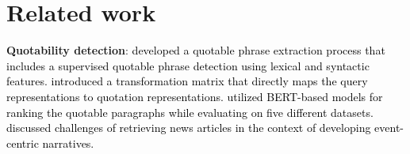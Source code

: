 \section{Related work}
\noindent\textbf{Quotability detection}:
\textcolor{black}{\citet{bendersky-smith-2012-dictionary} developed a quotable phrase extraction process that includes a supervised quotable phrase detection using lexical and syntactic features. \citet{wang_trans} introduced a transformation matrix that directly maps the query representations to quotation representations. \citet{maclaughlin-smith-2021-content} utilized BERT-based models for ranking the quotable paragraphs while evaluating on five different datasets. \citet{vosk} discussed challenges of retrieving news articles in the context of developing event-centric narratives.} 


